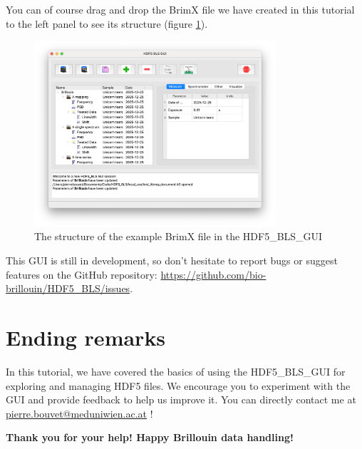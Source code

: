 \documentclass{article}
\begin{document}
You can of course drag and drop the BrimX file we have created in this tutorial to the left panel to see its structure (figure \ref{fig:brimx_structure}).

\begin{figure}[H]
    \centering
    \includegraphics[width=0.8\textwidth]{img/HDF5_BLS_GUI_BrimX_structure.png}
    \caption{The structure of the example BrimX file in the HDF5\_BLS\_GUI}
    \label{fig:brimx_structure}
\end{figure}

This GUI is still in development, so don't hesitate to report bugs or suggest features on the GitHub repository: \url{https://github.com/bio-brillouin/HDF5_BLS/issues}.

\section{Ending remarks}

In this tutorial, we have covered the basics of using the HDF5\_BLS\_GUI for exploring and managing HDF5 files. We encourage you to experiment with the GUI and provide feedback to help us improve it. You can directly contact me at \href{mailto:pierre.bouvet@meduniwien.ac.at}{pierre.bouvet@meduniwien.ac.at} !

\vspace{5\baselineskip}

\begin{center}
\textbf{Thank you for your help! Happy Brillouin data handling!}
\end{center}
\end{document}
